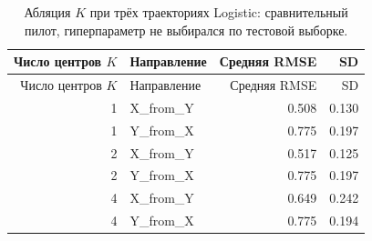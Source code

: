\begin{longtable}{rlrr}
\caption{Абляция $K$ при трёх траекториях Logistic: сравнительный пилот, гиперпараметр не выбирался по тестовой выборке.}\label{tab:ablation}\\
\toprule
Число центров $K$ & Направление & Средняя RMSE & SD \\
\midrule
\endfirsthead
\toprule
Число центров $K$ & Направление & Средняя RMSE & SD \\
\midrule
\endhead
1 & X\_from\_Y & 0.508 & 0.130 \\
1 & Y\_from\_X & 0.775 & 0.197 \\
2 & X\_from\_Y & 0.517 & 0.125 \\
2 & Y\_from\_X & 0.775 & 0.197 \\
4 & X\_from\_Y & 0.649 & 0.242 \\
4 & Y\_from\_X & 0.775 & 0.194 \\
\bottomrule
\end{longtable}
